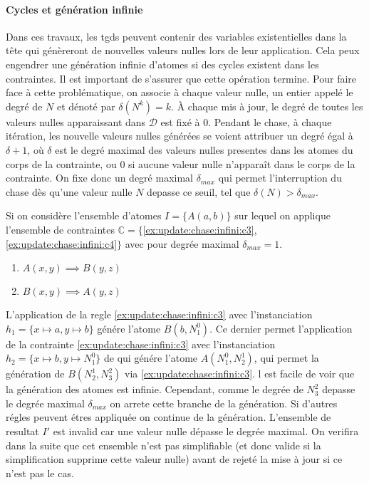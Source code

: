 \paragraph{Cycles et génération infinie}
Dans ces travaux, les \glspl{tgd} peuvent contenir des variables existentielles dans la tête qui génèreront de nouvelles valeurs nulles lors de leur application.
Cela peux engendrer une génération infinie d'atomes si des cycles existent dans les contraintes.
Il est important de s'assurer que cette opération termine.
Pour faire face à cette problématique, on associe à chaque valeur nulle, un entier appelé le degré de $N$ et dénoté par $\delta(N^k) = k$.
À chaque mis à jour, le degré de toutes les valeurs nulles apparaissant dans $\mathcal{D}$ est fixé à $0$.
Pendant le \gls{chase}, à chaque itération, les nouvelle valeurs nulles générées se voient attribuer un degré égal à $\delta + 1$, où $\delta$ est le degré maximal des valeurs nulles presentes dans les atomes du corps de la contrainte, ou $0$ si aucune valeur nulle n'apparaît dans le corps de la contrainte.
On fixe donc un degré maximal $\delta_{max}$ qui permet l'interruption du \gls{chase} dès qu'une valeur nulle $N$ depasse ce seuil, tel que $\delta(N) > \delta_{max}$.

\begin{example}
    \label{ex:update:chase:infini}
    Si on considère l'ensemble d'atomes $I = \{A(a, b)\}$ sur lequel on applique l'ensemble de contraintes $\mathbb{C} = \{$\ref{ex:update:chase:infini:c3}, \ref{ex:update:chase:infini:c4}$\}$ avec pour degrée maximal $\delta_{max} = 1$.
    \begin{enumerate}[label=\textbf{$c_\arabic*$ :},ref=$c_\arabic*$]
        \item $A(x, y) \implies B(y, z)$ \label{ex:update:chase:infini:c3}
        \item $B(x, y) \implies A(y, z)$ \label{ex:update:chase:infini:c4}
    \end{enumerate}

    L'application de la regle \ref{ex:update:chase:infini:c3} avec l'instanciation $h_1 = \{x \mapsto a, y \mapsto b\}$ génére l'atome $B(b, N_1^0)$.
    Ce dernier permet l'application de la contrainte \ref{ex:update:chase:infini:c3} avec l'instanciation $h_2 = \{x \mapsto b, y \mapsto N_1^0\}$ de qui génére l'atome $A(N_1^0, N_2^1)$, qui permet la génération de $B(N_2^1, N_3^2)$ via \ref{ex:update:chase:infini:c3}.
    l est facile de voir que la génération des atomes est infinie.
    Cependant, comme le degrée de $N_3^2$ depasse le degrée maximal $\delta_{max}$ on arrete cette branche de la génération.
    Si d'autres régles peuvent étres appliquée on continue de la génération.
    L'ensemble de resultat $I'$ est invalid car une valeur nulle dépasse le degrée maximal.
    On verifira dans la suite que cet ensemble n'est pas simplifiable (et donc valide si la simplification supprime cette valeur nulle) avant de rejeté la mise à jour si ce n'est pas le cas.
\end{example}

